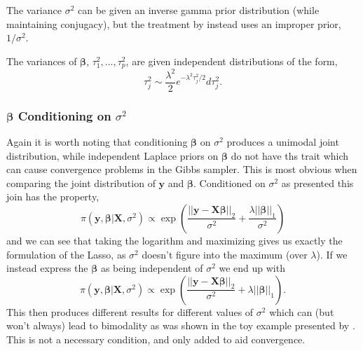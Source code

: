 \documentclass{uwstat572}
\begin{document}
The variance $\sigma^2$ can be given an inverse gamma prior distribution (while maintaining conjugacy), but the treatment by \cite{park2008bayesian} instead uses an improper prior, $1/\sigma^2$. 

The variances of $\boldsymbol\beta$, $\tau_1^2,...,\tau_p^2$, are given independent distributions of the form, \[ \tau^2_j \sim \frac{\lambda^2}{2}e^{-\lambda^2\tau^2_j/2}d\tau^2_j.\] 

\subsubsection{$\boldsymbol\beta$ Conditioning on $\sigma^2$}\label{unimodal}
Again it is worth noting that conditioning $\boldsymbol\beta$ on $\sigma^2$ produces a unimodal joint distribution, while independent Laplace priors on $\boldsymbol\beta$ do not have ths trait which can cause convergence problems in the Gibbs sampler. This is most obvious when comparing the joint distribution of $\mathbf{y}$ and $\boldsymbol\beta$. Conditioned on $\sigma^2$ as presented this join has the property, \[
\pi(\mathbf{y},\boldsymbol\beta|\mathbf{X},\sigma^2) \propto \exp{\left(\frac{||\mathbf{y}-\mathbf{X}\boldsymbol\beta||_2}{\sigma^2}+\frac{\lambda ||\boldsymbol\beta||_1}{\sigma^2}\right)}
\] and we can see that taking the logarithm and maximizing gives us exactly the formulation of the Lasso, as $\sigma^2$ doesn't figure into the maximum (over $\lambda$). If we instead express the $\boldsymbol\beta$ as being independent of $\sigma^2$ we end up with \[
\pi(\mathbf{y},\boldsymbol\beta|\mathbf{X},\sigma^2) \propto \exp{\left(\frac{||\mathbf{y}-\mathbf{X}\boldsymbol\beta||_2}{\sigma^2}+\lambda ||\boldsymbol\beta||_1\right)}.
\] This then produces different results for different values of $\sigma^2$ which can (but won't always) lead to bimodality as was shown in the toy example presented by \cite{park2008bayesian}. This is not a necessary condition, and only added to aid convergence.
\end{document}
